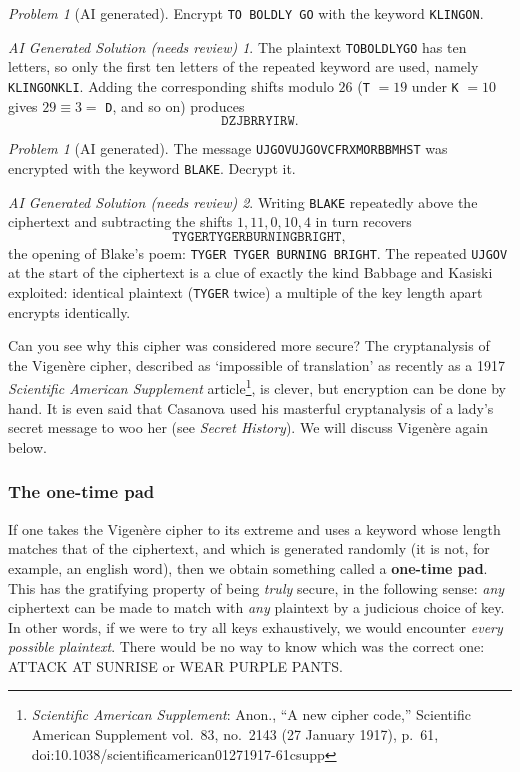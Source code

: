 \documentclass{article}
\theoremstyle{plain}
\theoremstyle{definition}
\theoremstyle{remark}
\newtheorem{problem}[theorem]{Problem}
\newtheorem*{aisolution}{AI Generated Solution (needs review)}
\numberwithin{theorem}{section}
\begin{document}
\begin{problem}[AI generated]
Encrypt \texttt{TO BOLDLY GO} with the keyword \texttt{KLINGON}.
\end{problem}
\begin{aisolution}
The plaintext \texttt{TOBOLDLYGO} has ten letters, so only the first ten letters of the repeated keyword are used, namely \texttt{KLINGONKLI}.  Adding the corresponding shifts modulo $26$ (\texttt{T} $=19$ under \texttt{K} $=10$ gives $29 \equiv 3 = $ \texttt{D}, and so on) produces
\[
	\texttt{DZJBRRYIRW}.
\]
\end{aisolution}

\begin{problem}[AI generated]
The message \texttt{UJGOVUJGOVCFRXMORBBMHST} was encrypted with the keyword \texttt{BLAKE}.  Decrypt it.
\end{problem}
\begin{aisolution}
Writing \texttt{BLAKE} repeatedly above the ciphertext and subtracting the shifts $1, 11, 0, 10, 4$ in turn recovers
\[
	\texttt{TYGERTYGERBURNINGBRIGHT},
\]
the opening of Blake's poem:  \texttt{TYGER TYGER BURNING BRIGHT}.  The repeated \texttt{UJGOV} at the start of the ciphertext is a clue of exactly the kind Babbage and Kasiski exploited:  identical plaintext (\texttt{TYGER} twice) a multiple of the key length apart encrypts identically.
\end{aisolution}

Can you see why this cipher was considered more secure?  The cryptanalysis of the Vigen\`ere cipher, described as `impossible of translation' as recently as a 1917 \emph{Scientific American Supplement} article\footnote{\emph{Scientific American Supplement}: Anon., ``A new cipher code,''
Scientific American Supplement vol.~83, no.~2143 (27 January 1917), p.~61,
doi:10.1038/scientificamerican01271917-61csupp}, is clever, but encryption can be done by hand.  It is even said that Casanova used his masterful cryptanalysis of a lady's secret message to woo her (see \emph{Secret History}).  We will discuss Vigen\`ere again below.



\subsubsection{The one-time pad}

If one takes the Vigen\`ere cipher to its extreme and uses a keyword whose length matches that of the ciphertext, and which is generated randomly (it is not, for example, an english word), then we obtain something called a \textbf{one-time pad}.  This has the gratifying property of being \emph{truly} secure, in the following sense:  \emph{any} ciphertext can be made to match with \emph{any} plaintext by a judicious choice of key.  In other words, if we were to try all keys exhaustively, we would encounter \emph{every possible plaintext}.  There would be no way to know which was the correct one:  ATTACK AT SUNRISE or WEAR PURPLE PANTS.
\end{document}
